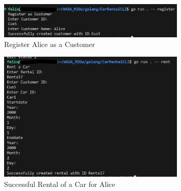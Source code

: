 \begin{figure}
      \centering
      \includegraphics[width=0.8\textwidth]{figures/goLang/carRental/carRentalCLI/carRentalCLI_RegisterAlice.png}
      \caption{Register Alice as a Customer}
      \label{fig:car_rental_cli_register_alice}
\end{figure}
\begin{figure}
      \centering
      \includegraphics[width=0.8\textwidth]{figures/goLang/carRental/carRentalCLI/carRentalCLI_SuccessfulRentalAlice.png}
      \caption{Successful Rental of a Car for Alice}
      \label{fig:car_rental_cli_rental_alice_successful}
\end{figure}
